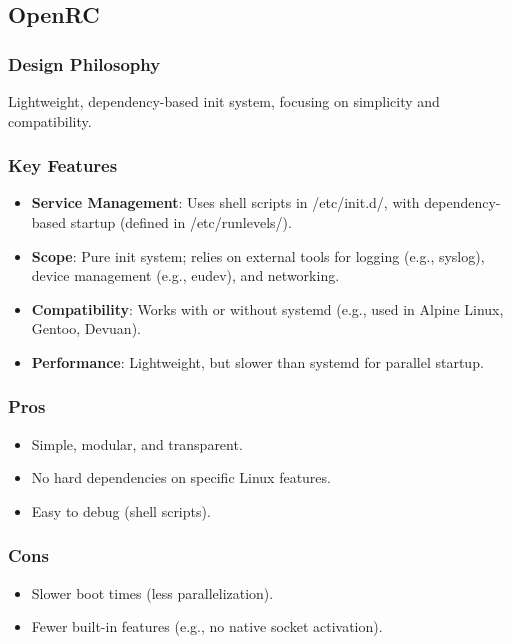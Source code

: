 \subsection{OpenRC}
\subsubsection{Design Philosophy}
Lightweight, dependency-based init system, focusing on simplicity and compatibility.


\subsubsection{Key Features}
\begin{itemize}
  \item \textbf{Service Management}: Uses shell scripts in /etc/init.d/, with dependency-based startup (defined in /etc/runlevels/).
  \item \textbf{Scope}: Pure init system; relies on external tools for logging (e.g., syslog), device management (e.g., eudev), and networking.
  \item \textbf{Compatibility}: Works with or without systemd (e.g., used in Alpine Linux, Gentoo, Devuan).
  \item \textbf{Performance}: Lightweight, but slower than systemd for parallel startup.
\end{itemize}


\subsubsection{Pros}
\begin{itemize}
  \item Simple, modular, and transparent.
  \item No hard dependencies on specific Linux features.
  \item Easy to debug (shell scripts).
\end{itemize}


\subsubsection{Cons}
\begin{itemize}
  \item Slower boot times (less parallelization).
  \item Fewer built-in features (e.g., no native socket activation).
\end{itemize}



